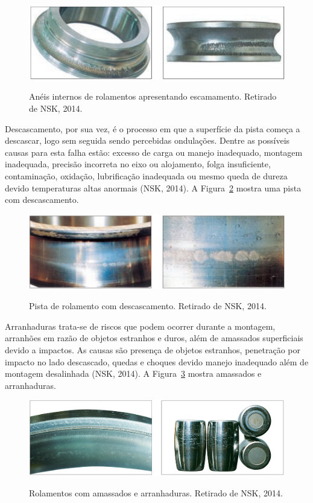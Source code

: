 \documentclass[
	12pt,				
	oneside,			
	a4paper,			
	english,			
	brazil,			
	]{abntex2ppgsi}
\begin{document}
\begin{figure}[H]
\centering
\caption {Anéis internos de rolamentos apresentando escamamento. Retirado de NSK, 2014.}
\includegraphics[width=\textwidth,height=\textheight,keepaspectratio]{escamamento_nsk}
\label{escamemento_nsk}
\end{figure}

Descascamento, por sua vez, é o processo em que a superfície da pista começa a descascar, logo sem seguida sendo percebidas ondulações. Dentre as possíveis causas para esta falha estão: excesso de carga ou manejo inadequado, montagem inadequada, precisão incorreta no eixo ou alojamento, folga insuficiente, contaminação, oxidação, lubrificação inadequada ou mesmo queda de dureza devido temperaturas altas anormais (NSK, 2014). A Figura~\ref{descascamento_nsk} mostra uma pista com descascamento.

\begin{figure}[H]
\centering
\caption {Pista de rolamento com descascamento. Retirado de NSK, 2014.}
\includegraphics[width=\textwidth,height=\textheight,keepaspectratio]{descascamento_nsk}
\label{descascamento_nsk}
\end{figure}

Arranhaduras trata-se de riscos que podem ocorrer durante a montagem, arranhões em razão de objetos estranhos e duros, além de amassados superficiais devido a impactos. As causas são presença de objetos estranhos, penetração por impacto no lado descascado, quedas e choques devido manejo inadequado além de montagem desalinhada (NSK, 2014). A Figura~\ref{arranhaduras_nsk} mostra amassados e arranhaduras. 

\begin{figure}[H]
\centering
\caption {Rolamentos com amassados e arranhaduras. Retirado de NSK, 2014.}
\includegraphics[width=\textwidth,height=\textheight,keepaspectratio]{arranhaduras_nsk}
\label{arranhaduras_nsk}
\end{figure}
\end{document}
